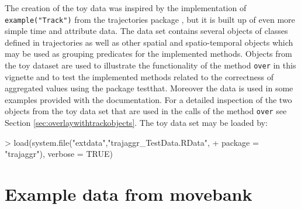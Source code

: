 \documentclass[12pt, oneside, a4paper]{scrbook}
\newcommand{\pkg}[1]{{\normalfont\fontseries{b}\selectfont #1}}
\let\code=\texttt
\begin{document}

The creation of the toy data was inspired by the implementation of \code{example("Track")} from the \pkg{trajectories} package \citep{klus_analysing_2014}, but it is built up of even more simple time and attribute data.
The data set contains several objects of classes defined in \pkg{trajectories} as well as other spatial and spatio-temporal objects which may be used as grouping predicates for the implemented methods. 
Objects from the toy dataset are used to illustrate the functionality of the method \code{over} in this vignette and to test the implemented methods related to the correctness of aggregated values using the package \pkg{testthat}. Moreover the data is used in some examples provided with the documentation.
For a detailed inspection of the two objects from the toy data set that are used in the calls of the method \code{over} see Section \ref{sec:overlaywithtrackobjects}.
The toy data set may be loaded by:
\par\medskip

\begin{small}
\begin{Schunk}
\begin{Sinput}
> load(system.file("extdata","trajaggr_TestData.RData", 
+                  package = "trajaggr"), verbose = TRUE)
\end{Sinput}
\end{Schunk}
\end{small}

\par\medskip



\section{Example data from movebank}
\label{sec:exampledatamovebank}


\end{document}
